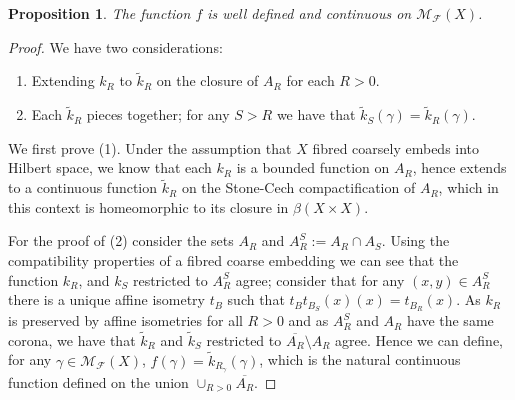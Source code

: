 \documentclass[preprint]{elsarticle}
\theoremstyle{plain}
\newtheorem{proposition}[theorem]{Proposition}%
\theoremstyle{definition}%
\theoremstyle{remark}%
\begin{document}
\begin{proposition}\label{prop:wd}
The function $f$ is well defined and continuous on $\mathcal{M}_{\mathcal{F}}(X)$.
\end{proposition}
\begin{proof}
We have two considerations:
\begin{enumerate}
\item Extending $k_{R}$ to $\tilde{k}_{R}$ on the closure of $A_{R}$ for each $R>0$.
\item Each $\tilde{k}_{R}$ pieces together; for any $S>R$ we have that $\tilde{k}_{S}(\gamma)=\tilde{k}_{R}(\gamma)$.
\end{enumerate}
We first prove (1). Under the assumption that $X$ fibred coarsely embeds into Hilbert space, we know that each $k_{R}$ is a bounded function on $A_{R}$, hence extends to a continuous function $\tilde{k}_{R}$ on the Stone-Cech compactification of $A_{R}$, which in this context is homeomorphic to its closure in $\beta(X \times X)$. 

For the proof of (2) consider the sets $A_{R}$ and $A_{R}^{S}:=A_{R}\cap A_{S}$. Using the compatibility properties of a fibred coarse embedding we can see that the function $k_{R}$, and $k_{S}$ restricted to $A_{R}^{S}$ agree; consider that for any $(x,y)\in A_{R}^{S}$ there is a unique affine isometry $t_{B}$ such that $t_{B}t_{B_{S}}(x)(x) = t_{B_{R}}(x)$. As $k_{R}$ is preserved by affine isometries for all $R>0$ and as $A_{R}^{S}$ and $A_{R}$ have the same corona, we have that $\tilde{k}_{R}$ and $\tilde{k}_{S}$ restricted to $\overline{A_{R}}\setminus A_{R}$ agree. Hence we can define, for any $\gamma \in \mathcal{M}_{\mathcal{F}}(X)$, $f(\gamma) = \tilde{k}_{R_{\gamma}}(\gamma)$, which is the natural continuous function defined on the union $\cup_{R>0}\overline{A_{R}}$.
\end{proof}
\end{document}
